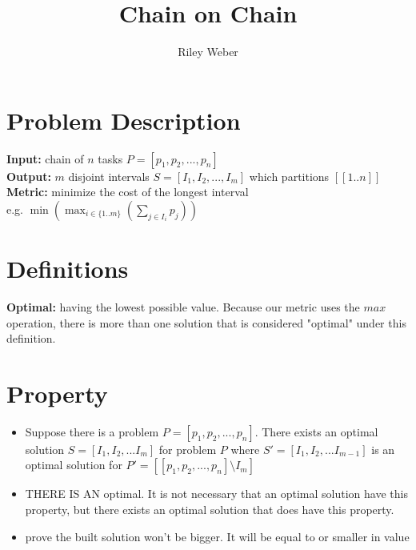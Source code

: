 \documentclass{article}
\author{Riley Weber}
\title{Chain on Chain}
\begin{document}
\maketitle

\section{Problem Description}

\textbf{Input:} chain of $n$ tasks $P = [p_1, p_2, ..., p_n]$
\\\textbf{Output:} $m$ disjoint intervals  $S = [I_1, I_2, ..., I_m]$ which
partitions $[[1..n]]$
\\\textbf{Metric:} minimize the cost of the longest interval
\\e.g. $\min(\max_{i\in\{1..m\}}(\sum_{j \in{I_i}} p_j))$ 

\section{Definitions}
\textbf{Optimal:} having the lowest possible value. Because our metric uses the
$max$ operation, there is more than one solution that is considered "optimal"
under this definition.

\section{Property}
\begin{itemize}
\item Suppose there is a problem $P = [p_1, p_2, ..., p_n]$. There exists an
optimal solution $S = [I_1, I_2, ... I_m]$ for problem $P$ 
where $S' = [I_1, I_2, ... I_{m-1}]$ is an optimal solution for 
$P' = [[p_1, p_2, ..., p_n] \setminus I_m]$
\item THERE IS AN optimal. It is not necessary that an optimal solution have
this property, but there exists an optimal solution that does have this
property.
\item prove the built solution won't be bigger. It will be equal to or
smaller in value
\end{itemize}
\end{document}
